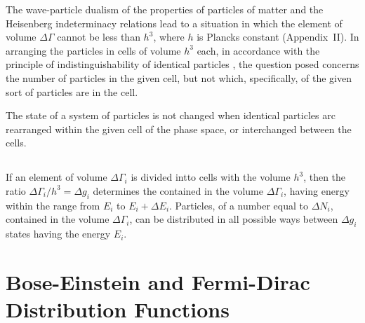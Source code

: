 The wave-particle dualism of the properties of particles of matter  and the Heisenberg indeterminacy relations  lead to a situation in which the element of volume $\Delta \Gamma$ cannot be less than $h^{3}$, where $h$ is Plancks constant (Appendix~II). In arranging the particles in cells of volume $h^{3}$ each, in accordance with the principle of indistinguishability of identical particles , the question posed concerns the number of particles in the given cell, but not
which, specifically, of the given sort of particles are in the cell.

The state of a system of particles is not changed when identical particles arc rearranged within the given cell of the phase space, or interchanged between the cells. 

\subsection{}\label{41.1.4} If an element of volume $\Delta \Gamma_{i}$ is divided intto cells with the volume $h^{3}$, then the ratio $\Delta \Gamma_{i} /h^{3} = \Delta g_{i}$ determines the  contained in the volume $\Delta \Gamma_{i}$, having energy within the range from $E_{i}$ to $E_{i} + \Delta E_{i}$. Particles, of a number equal to $\Delta N_{i}$, contained in the volume $\Delta \Gamma_{i}$, can be distributed in all possible ways between $\Delta g_{i}$ states having the energy $E_{i}$.

\section{Bose-Einstein and Fermi-Dirac Distribution Functions}
\label{sec-41.2} 


